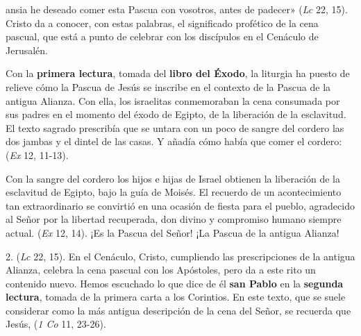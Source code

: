 \begin{body}
 ansia he deseado comer esta Pascua con vosotros, antes de padecer» (\textit{Lc} 22, 15). Cristo da a conocer, con estas palabras, el significado profético de la cena pascual, que está a punto de celebrar con los discípulos en el Cenáculo de Jerusalén.

Con la \textbf{primera lectura}, tomada del \textbf{libro del Éxodo}, la liturgia ha puesto de relieve cómo la Pascua de Jesús se inscribe en el contexto de la Pascua de la antigua Alianza. Con ella, los israelitas conmemoraban la cena consumada por sus padres en el momento del éxodo de Egipto, de la liberación de la esclavitud. El texto sagrado prescribía que se untara con un poco de sangre del cordero las dos jambas y el dintel de las casas. Y añadía cómo había que comer el cordero:  (\textit{Ex} 12, 11-13).

Con la sangre del cordero los hijos e hijas de Israel obtienen la liberación de la esclavitud de Egipto, bajo la guía de Moisés. El recuerdo de un acontecimiento tan extraordinario se convirtió en una ocasión de fiesta para el pueblo, agradecido al Señor por la libertad recuperada, don divino y compromiso humano siempre actual.  (\textit{Ex} 12, 14). ¡Es la Pascua del Señor! ¡La Pascua de la antigua Alianza!

2.  (\textit{Lc} 22, 15). En el Cenáculo, Cristo, cumpliendo las prescripciones de la antigua Alianza, celebra la cena pascual con los Apóstoles, pero da a este rito un contenido nuevo. Hemos escuchado lo que dice de él \textbf{san Pablo} en la \textbf{segunda lectura}, tomada de la primera carta a los Corintios. En este texto, que se suele considerar como la más antigua descripción de la cena del Señor, se recuerda que Jesús,  (\textit{1 Co} 11, 23-26).


\end{body}
